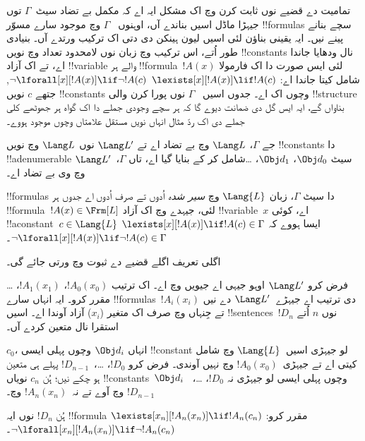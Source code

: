 \documentclass[../../../include/open-logic-section]{subfiles}
\begin{document}


\begin{explain}
تمامیت دے قضیے نوں ثابت کرن وچ اک مشکل ایہ اے کہ مکمل بے تضاد
سیٹ~$\Gamma$ توں جیہڑا ماڈل اسیں بناندے آں، اوہنوں
~$\Gamma$ وچ موجود سارے مسوّر !!{formula}s سچے بنانے پینے نیں۔
ایہ یقینی بناؤن لئی اسیں لیون ہینکن دی دتی اک ترکیب ورتدے آں۔
بنیادی طور اُتے، اس ترکیب وچ زبان نوں لامحدود تعداد وچ نویں
!!{constant}s نال ودھایا جاندا اے، تے اک آزاد !!{variable}
والے ہر !!{formula}~$!A(x)$ لئی ایس صورت دا اک فارمولا
شامل کیتا جاندا اے:
      {$\lexists[x][!A(x)] \lif !A(c)$}
      {$\lnot\lforall[x][!A(x)] \lif \lnot !A(c)$},
جتھے $c$ نویں !!{constant}s وچوں اک اے۔ جدوں اسیں
~$\Gamma$ نوں پورا کرن والی !!{structure} بناواں گے،
ایہ ایس گل دی ضمانت دیوے گا کہ
{ہر سچے وجودی جملے دا اک گواہ}
{ہر جھوٹھے کلی جملے دی اک ردّ مثال}
انہاں نویں مستقل علامتاں وچوں موجود ہووے۔
\end{explain}

\begin{prop}
جے $\Gamma$، $\Lang L$ وچ بے تضاد اے تے $\Lang L'$
نوں $\Lang L$ وچ نویں !!{constant}s دا
!!a{denumerable} سیٹ $\Obj d_0$،
$\Obj d_1$، \dots شامل کر کے بنایا گیا اے، تاں
$\Gamma$،~$\Lang L'$ وچ وی بے تضاد اے۔
\end{prop}

\begin{defn}
!!{formula}s دا سیٹ $\Gamma$، زبان $\Lang {L}$ وچ
\emph{سیر شدہ} اُدوں تے صرف اُدوں اے جدوں ہر
!!{formula}~$!A(x) \in \Frm[L]$ لئی، جیہدے وچ اک
آزاد !!{variable}~$x$ اے، کوئی
!!a{constant}~$c \in \Lang{L}$ ایسا ہووے کہ
      {$\lexists[x][!A(x)] \lif !A(c) \in \Gamma$}
      {$\lnot\lforall[x][!A(x)] \lif \lnot !A(c) \in \Gamma$}۔
\end{defn}

اگلی تعریف اگلے قضیے دے ثبوت وچ ورتی جائے گی۔

\begin{defn}
فرض کرو $\Lang L'$ اوہو جیہی اے جیویں
 وچ اے۔ اک ترتیب
$!A_0(x_0)$، $!A_1(x_1)$، \dots مقرر کرو۔
ایہ انہاں سارے !!{formula}s~$!A_i(x_i)$ دی ترتیب
اے جیہڑے~$\Lang L'$ دے نیں تے جِنہاں وچ صرف اک
متغیر ($x_i$) آزاد آوندا اے۔ اسیں
!!{sentence}s~$!D_n$ نوں $n$ اُتے استقرا نال متعین کردے آں۔

$c_0$، انہاں $\Obj d_i$ وچوں پہلی ایسی
!!{constant} لو جیہڑی اسیں~$\Lang{L}$ وچ شامل کیتی
اے تے جیہڑی~$!A_0(x_0)$ وچ نہیں آوندی۔ فرض کرو
$!D_0$، \dots،~$!D_{n-1}$ پہلے ہی متعین ہو چکے نیں؛
ہُن $c_n$ نویاں !!{constant}s~$\Obj d_i$ وچوں پہلی
ایسی لو جیہڑی نہ $!D_0$، \dots،~$!D_{n-1}$ وچ
آوے تے نہ~$!A_n(x_n)$ وچ۔

ہُن $!D_{n}$ نوں ایہ !!{formula} مقرر کرو:
{$\lexists[x_{n}][!A_{n}(x_{n})] \lif
  !A_{n}(c_{n})$}{$\lnot\lforall[x_{n}][!A_{n}(x_{n})] \lif \lnot
  !A_{n}(c_{n})$}۔
\end{defn}
\end{document}
